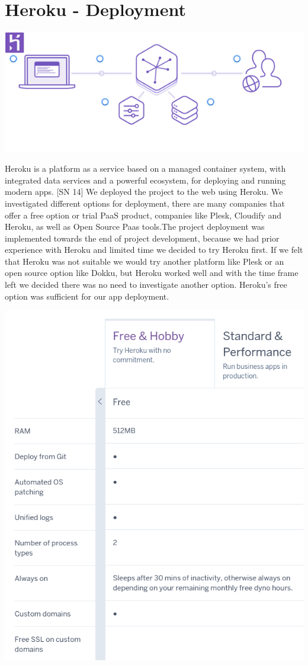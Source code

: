 \section{Heroku - Deployment}
\begin{center}
      \includegraphics{img/HerokuArchitecture.png}
\end{center}
Heroku is a platform as a service based on a managed container system, with integrated data services and a powerful ecosystem, for deploying and running modern apps. [SN 14]
We deployed the project to the web using Heroku. We investigated different options for deployment, there are many companies that offer a free option or trial PaaS product, companies like Plesk, Cloudify and Heroku, as well as Open Source Paas tools.The project deployment was implemented towards the end of project development, because we had prior experience with Heroku and limited time we decided to try Heroku first. If we felt that Heroku was not suitable we would try another platform like Plesk or an open source option like Dokku, but Heroku worked well and with the time frame left we decided there was no need to investigate another option. Heroku's free option was sufficient for our app deployment.
\begin{center}
      \includegraphics[scale=0.6]{img/HerokuStats.PNG}
\end{center}


